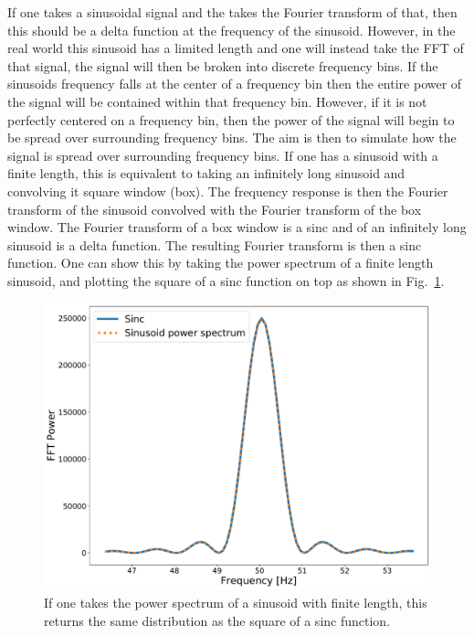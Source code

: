 If one takes a sinusoidal signal and the takes the Fourier transform of that, then this should be a delta function at the frequency of the sinusoid. 
However, in the real world this sinusoid has a limited length and one will instead take the \gls{FFT} of that signal, the signal will then be broken into discrete frequency bins.
If the sinusoids frequency falls at the center of a frequency bin then the entire power of the signal will be contained within that frequency bin.
However, if it is not perfectly centered on a frequency bin, then the power of the signal will begin to be spread over surrounding frequency bins. 
The aim is then to simulate how the signal is spread over surrounding frequency bins.
If one has a sinusoid with a finite length, this is equivalent to taking an infinitely long sinusoid and convolving it square window (box). 
The frequency response is then the Fourier transform of the sinusoid convolved with the Fourier transform of the box window.
The Fourier transform of a box window is a sinc and of an infinitely long sinusoid is a delta function. 
The resulting Fourier transform is then a sinc function.
One can show this by taking the power spectrum of a finite length sinusoid, and plotting the square of a sinc function on top as shown in Fig.~\ref{app1:sin:sinc}.

\begin{figure}
	\centering
	\includegraphics[width=0.7\linewidth]{AppendixA/sinc_fft.pdf}
	\caption{If one takes the power spectrum of a sinusoid with finite length, this returns the same distribution as the square of a sinc function.}
	\label{app1:sin:sinc}
\end{figure}

